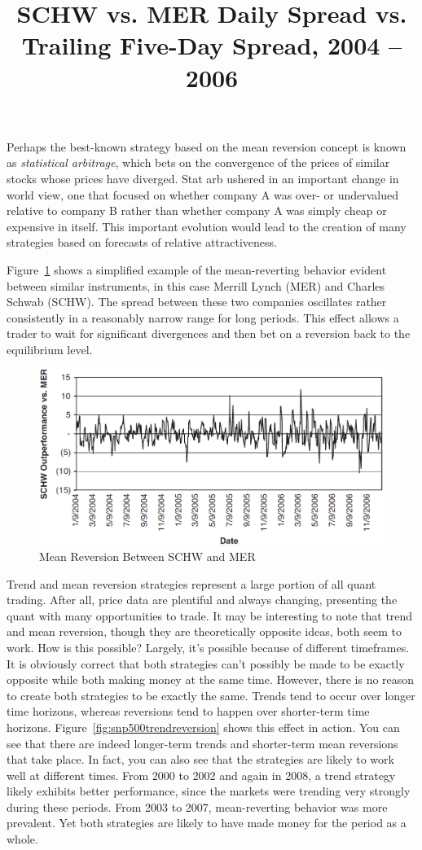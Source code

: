 \documentclass[11pt]{report}
\begin{document}
					Perhaps the best-known strategy based on the mean reversion concept is known as \textit{statistical arbitrage}, which bets on the convergence of the prices of similar stocks whose prices have diverged. Stat arb ushered in an important change in world view, one that focused on whether company A was over- or undervalued relative to company B rather than whether company A was simply cheap or expensive in itself. This important evolution would lead to the creation of many strategies based on forecasts of relative attractiveness.

					Figure~\ref{fig:reversionspread} shows a simplified example of the mean-reverting behavior evident between similar instruments, in this case Merrill Lynch (MER) and Charles Schwab (SCHW). The spread between these two companies oscillates rather consistently in a reasonably narrow range for long periods. This effect allows a trader to wait for significant divergences and then bet on a reversion back to the equilibrium level.

					\begin{figure}[htbp]
						\centering
						\title{SCHW vs. MER Daily Spread vs. Trailing Five-Day Spread, 2004 -- 2006}
						\includegraphics[width=.9\textwidth]{reversionspread.png}
						\caption{Mean Reversion Between SCHW and MER}
						\label{fig:reversionspread}
					\end{figure}

					Trend and mean reversion strategies represent a large portion of all quant trading. After all, price data are plentiful and always changing, presenting the quant with many opportunities to trade. It may be interesting to note that trend and mean reversion, though they are theoretically opposite ideas, both seem to work. How is this possible? Largely, it's possible because of different timeframes. It is obviously correct that both strategies can't possibly be made to be exactly opposite while both making money at the same time. However, there is no reason to create both strategies to be exactly the same. Trends tend to occur over longer time horizons, whereas reversions tend to happen over shorter-term time horizons. Figure~\ref{fig:snp500trendreversion} shows this effect in action. You can see that there are indeed longer-term trends and shorter-term mean reversions that take place. In fact, you can also see that the strategies are likely to work well at different times. From 2000 to 2002 and again in 2008, a trend strategy likely exhibits better performance, since the markets were trending very strongly during these periods. From 2003 to 2007, mean-reverting behavior was more prevalent. Yet both strategies are likely to have made money for the period as a whole.
\end{document}
